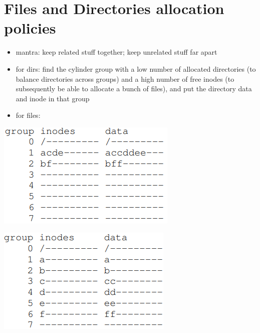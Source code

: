 \section*{Files and Directories allocation policies}
\begin{itemize}
\item mantra: keep related stuff together; keep unrelated stuff far apart
\item for dirs: find the cylinder group with a low number of allocated directories (to balance directories across groups) and a high number of free inodes (to subsequently be able to allocate a bunch of files), and put the directory data and inode in that group
\item for files:
\end{itemize}
\begin{minipage}{.5\linewidth}
  \includegraphics[width=\linewidth]{imgs/ffs_policy1}
\end{minipage}
\begin{minipage}{.5\linewidth}
  \includegraphics[width=\linewidth]{imgs/ffs_policy2}
\end{minipage}
